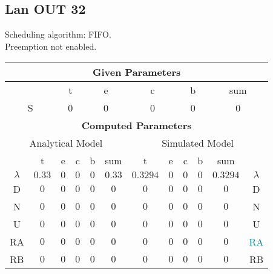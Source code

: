 \documentclass{article}
\begin{document}
\subsection{Lan OUT 32}
Scheduling algorithm: FIFO.\\Preemption not enabled. \\\begin{table}[H]\centering\begin{tabular}{@{}c|cccc|c||cccc|c|c@{}}\toprule\multicolumn{12}{c}{\textbf{Given Parameters}}\\\midrule\multicolumn{2}{c|}{ } & \multicolumn{2}{c}{t} & \multicolumn{2}{c}{e} & \multicolumn{2}{c}{c} & \multicolumn{2}{c}{b} & \multicolumn{2}{|c}{sum} \\ \midrule\multicolumn{2}{c|}{S} & \multicolumn{2}{c}{0} & \multicolumn{2}{c}{0} & \multicolumn{2}{c}{0} & \multicolumn{2}{c}{0} & \multicolumn{2}{|c}{0}\\ \midrule\midrule\multicolumn{12}{c}{\textbf{Computed Parameters}}\\ \midrule\multicolumn{6}{c||}{Analytical Model} & \multicolumn{6}{c}{Simulated Model}\\ 
 \midrule & t & e & c & b & sum & t & e & c & b & sum &  \\ \midrule$\lambda$ &$0.33$ & $0$ & $0$ & $0$ & $0.33$ & $0.3294$ & $0$ & $0$ & $0$ & $0.3294$& $\lambda$ \\D & $0$ & $0$ & $0$ & $0$ & $0$ & $0$ & $0$ & $0$ & $0$ & $0$& D\\N & $0$ & $0$ & $0$ & $0$ & $0$ & $0$ & $0$ & $0$ & $0$ & $0$& N\\U & $0$ & $0$ & $0$ & $0$ & $0$ & $0$ & $0$ & $0$ & $0$ & $0$& U\\RA & $0$ & $0$ & $0$ & $0$ & $0$ & $0$ & $0$ & $0$ & $0$ & $0$& \textcolor{teal}{RA}\\RB & $0$ & $0$ & $0$ & $0$ & $0$ & $0$ & $0$ & $0$ & $0$ & $0$& RB\\
\bottomrule
\end{tabular}
\end{table}
\filbreak
\end{document}
